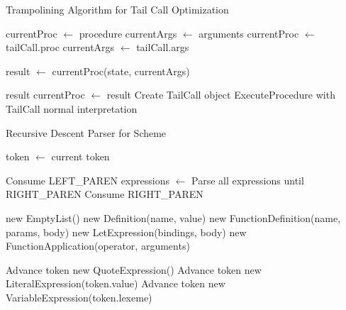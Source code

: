 \documentclass[final]{cmpreport_02}
\begin{document}
\begin{algorithm}
\caption{Trampolining Algorithm for Tail Call Optimization}
\label{alg:trampoline}
\begin{algorithmic}[1]
\State currentProc $\gets$ procedure
\State currentArgs $\gets$ arguments
        \State currentProc $\gets$ tailCall.proc
        \State currentArgs $\gets$ tailCall.args
    \EndWhile
    
    \State result $\gets$ currentProc(state, currentArgs)
    
        \State \Return result
    \Else
        \State currentProc $\gets$ result
    \EndIf
\EndWhile
\EndProcedure
{}
\State Create TailCall object
\State \Return ExecuteProcedure with TailCall
\Else
\State \Return normal interpretation
\EndIf
\EndProcedure
\end{algorithmic}
\end{algorithm}

\begin{algorithm}
\caption{Recursive Descent Parser for Scheme}
\label{alg:recursive-descent}
\begin{algorithmic}[1]
    \State \Return {}
\EndProcedure

    \State token $\gets$ current token
    
        \State Consume LEFT\_PAREN
        \State expressions $\gets$ Parse all expressions until RIGHT\_PAREN
        \State Consume RIGHT\_PAREN
        
            \State \Return new EmptyList()
                \State \Return new Definition(name, value)
            \Else
                \State \Return new FunctionDefinition(name, params, body)
            \EndIf
            \State \Return new LetExpression(bindings, body)
        \Else
            \State \Return new FunctionApplication(operator, arguments)
        \EndIf
        
        \State Advance token
        \State \Return new QuoteExpression()
        \State Advance token
        \State \Return new LiteralExpression(token.value)
        \State Advance token
        \State \Return new VariableExpression(token.lexeme)
    \EndIf
\EndProcedure
\end{algorithmic}
\end{algorithm}
\end{document}
